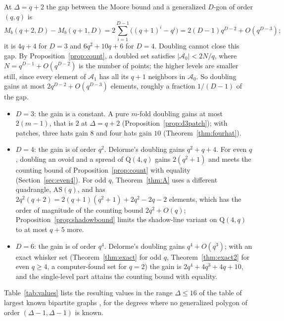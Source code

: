 \documentclass[11pt]{amsart}
\theoremstyle{definition}
\theoremstyle{remark}
\newcommand{\cA}{\mathcal{A}}
\newcommand{\AS}{\mathrm{AS}}
\newcommand{\Qf}{\mathrm{Q}}
\begin{document}
At $\Delta=q+2$ the gap between the Moore bound and a generalized $D$-gon of order $(q,q)$ is
\[
M_b(q+2,D)-M_b(q+1,D)=2\sum_{i=1}^{D-1}\bigl((q+1)^i-q^i\bigr)=2(D-1)q^{D-2}+O(q^{D-3});
\]
it is $4q+4$ for $D=3$ and $6q^2+10q+6$ for $D=4$. Doubling cannot close this gap. By Proposition~\ref{prop:count}, a doubled set satisfies $|\cA_0|<2N/q$, where $N=q^{D-1}+O(q^{D-2})$ is the number of points; the higher levels are smaller still, since every element of $\cA_1$ has all its $q+1$ neighbors in $\cA_0$. So doubling gains at most $2q^{D-2}+O(q^{D-3})$ elements, roughly a fraction $1/(D-1)$ of the gap.
\begin{itemize}[leftmargin=1.5em]
\item $D=3$: the gain is a constant. A pure $m$-fold doubling gains at most $2(m-1)$, that is $2$ at $\Delta=q+2$ (Proposition~\ref{prop:d3patch}); with patches, three hats gain $8$ \cite{AL20} and four hats gain $10$ (Theorem~\ref{thm:fourhat}).
\item $D=4$: the gain is of order $q^2$. Delorme's doubling gains $q^2+q+4$. For even $q$, doubling an ovoid and a spread of $\Qf(4,q)$ gains $2(q^2+1)$ and meets the counting bound of Proposition~\ref{prop:count} with equality (Section~\ref{sec:even4}). For odd $q$, Theorem~\ref{thm:A} uses a different quadrangle, $\AS(q)$, and has $2q^2(q+2)=2(q+1)(q^2+1)+2q^2-2q-2$ elements, which has the order of magnitude of the counting bound $2q^2+O(q)$; Proposition~\ref{prop:shadowbound} limits the shadow-line variant on $\Qf(4,q)$ to at most $q+5$ more.
\item $D=6$: the gain is of order $q^4$. Delorme's doubling gains $q^4+O(q^3)$; with an exact whisker set (Theorem~\ref{thm:exact} for odd $q$, Theorem~\ref{thm:exact2} for even $q\ge4$, a computer-found set for $q=2$) the gain is $2q^4+4q^3+4q+10$, and the single-level part attains the counting bound with equality.
\end{itemize}

Table~\ref{tab:values} lists the resulting values in the range $\Delta\le16$ of the table of largest known bipartite graphs \cite{CW}, for the degrees where no generalized polygon of order $(\Delta-1,\Delta-1)$ is known.
\end{document}
